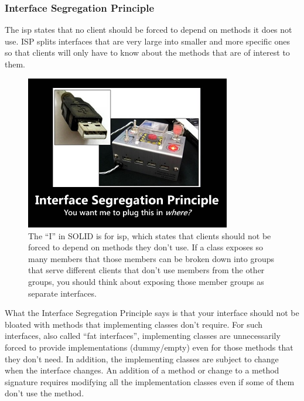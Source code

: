 \subsubsection{Interface Segregation Principle}

\begin{framed}
	The \gls{isp} states that no client should be forced to depend on methods it does not use.
	ISP splits interfaces that are very large into smaller and more specific ones so that clients will only have to know about the methods that are of interest to them.
\end{framed}

\begin{figure}
	\centering
	\includegraphics[width=0.8\textwidth]{images/kotlin/ISP.jpg}
	\caption{The “I” in SOLID is for \gls{isp}, which states that clients should not be forced to depend on methods they don’t use.
		If a class exposes so many members that those members can be broken down into groups that serve different clients that don’t use members from the other groups, you should think about exposing those member groups as separate interfaces.}
	\label{fir:lsp}
\end{figure}

What the Interface Segregation Principle says is that your interface should not be bloated with methods that implementing classes don’t require.
For such interfaces, also called “fat interfaces”, implementing classes are unnecessarily forced to provide implementations (dummy/empty) even for those methods that they don’t need.
In addition, the implementing classes are subject to change when the interface changes.
An addition of a method or change to a method signature requires modifying all the implementation classes even if some of them don’t use the method.

